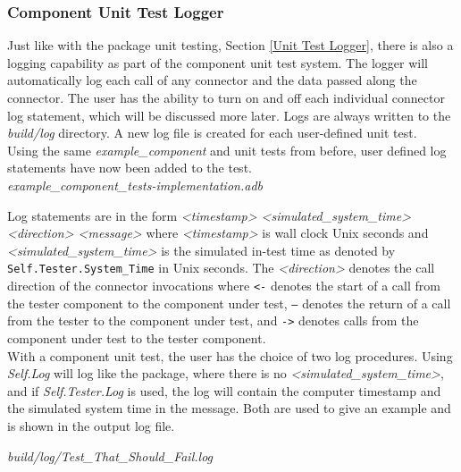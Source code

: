 \subsubsection{Component Unit Test Logger} \label{Component Unit Test Logger}

Just like with the package unit testing, Section \ref{Unit Test Logger}, there is also a logging capability as part of the component unit test system. The logger will automatically log each call of any connector and the data passed along the connector. The user has the ability to turn on and off each individual connector log statement, which will be discussed more later. Logs are always written to the \textit{build/log} directory. A new log file is created for each user-defined unit test. \\

Using the same \textit{example\_component} and unit tests from before, user defined log statements have now been added to the test. \\

\textit{example\_component\_tests-implementation.adb}

Log statements are in the form \textit{<timestamp> <simulated\_system\_time> <direction> <message>} where \textit{<timestamp>} is wall clock Unix seconds and \textit{<simulated\_system\_time>} is the simulated in-test time as denoted by \texttt{Self.Tester.System\_Time} in Unix seconds. The \textit{<direction>} denotes the call direction of the connector invocations where \texttt{<-} denotes the start of a call from the tester component to the component under test, \texttt{--} denotes the return of a call from the tester to the component under test, and \texttt{->} denotes calls from the component under test to the tester component. \\

With a component unit test, the user has the choice of two log procedures. Using \textit{Self.Log} will log like the package, where there is no \textit{<simulated\_system\_time>}, and if \textit{Self.Tester.Log} is used, the log will contain the computer timestamp and the simulated system time in the message. Both are used to give an example and is shown in the output log file.

\vspace{5mm} %
\textit{build/log/Test\_That\_Should\_Fail.log}
\inputminted{text}{../example_architecture/example_component/test4/build/log/Test_That_Should_Fail.log}
\vspace{5mm} %

